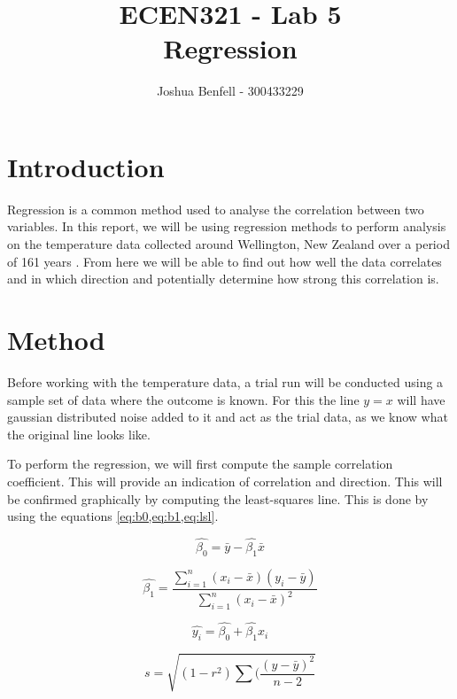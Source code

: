 \documentclass[a4paper, 12pt]{article}
\title{ECEN321 - Lab 5 \\
    Regression
}
\author{Joshua Benfell - 300433229}
\begin{document}
    \maketitle
    
    \section{Introduction}
        Regression is a common method used to analyse the correlation between two variables. In this report, we will be using regression methods to perform analysis on the temperature data collected around Wellington, New Zealand over a period of 161 years \cite{earth_2020}. From here we will be able to find out how well the data correlates and in which direction and potentially determine how strong this correlation is. 
    \section{Method}
        Before working with the temperature data, a trial run will be conducted using a sample set of data where the outcome is known. For this the line $y = x$ will have gaussian distributed noise added to it and act as the trial data, as we know what the original line looks like.
        \par
        To perform the regression, we will first compute the sample correlation coefficient. This will provide an indication of correlation and direction. This will be confirmed graphically by computing the least-squares line. This is done by using the equations \cref{eq:b0,eq:b1,eq:lsl}.

        \begin{equation}
            \label{eq:b0}
            \hat{\beta_0} = \bar{y} - \hat{\beta_1} \bar{x}
        \end{equation}


        \begin{equation}
            \label{eq:b1}
            \hat{\beta_1} = \frac{\sum_{i=1}^{n}{(x_i - \bar{x})(y_i - \bar{y})}}{\sum_{i=1}^{n}{(x_i - \bar{x})^2}}
        \end{equation}

        \begin{equation}
            \label{eq:lsl}
            \hat{y_i} = \hat{\beta_0} + \hat{\beta_1} x_i
        \end{equation}

        \begin{equation}
            \label{eq:sd}
            s = \sqrt{(1-r^2)\sum(\frac{(y-\bar{y})^2}{n-2}}
        \end{equation}
\end{document}
